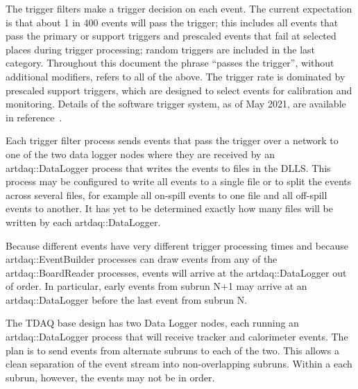 
The trigger filters make a trigger decision on each event.
The current expectation is that about 1 in 400 events will pass the trigger;
this includes all events that pass the primary or support triggers
and prescaled events that fail at selected places during trigger processing;
random triggers are included in the last category.
Throughout this document the phrase ``passes the trigger'', without additional modifiers,
refers to all of the above.
The trigger rate is dominated by prescaled support triggers,
which are designed to select events for calibration and monitoring.
Details of the software trigger system, as of May 2021,
are available in reference~\cite{TriggerSU2020}.


Each \art trigger filter process sends events that pass the trigger over a network
to one of the two data logger nodes where they are received by an {\code artdaq::DataLogger} process
that writes the events to files in the DLLS.
This process may be configured to write all events to a single file
or to split the events across several files,
for example all on-spill events to one file and all off-spill events to another.
It has yet to be determined exactly how many files will be written
by each {\code artdaq::DataLogger}.

\begin{sloppypar}
Because different events have very different trigger processing times
and because {\code artdaq::EventBuilder} processes can draw events from
any of the {\code artdaq::BoardReader} processes, events will arrive at the
{\code artdaq::DataLogger} out of order.  In particular, early events from subrun N+1
may arrive at an {\code artdaq::DataLogger} before the last event from subrun N.
\end{sloppypar}

The TDAQ base design has two Data Logger nodes, each running an
{\code artdaq::DataLogger} process that will receive tracker and calorimeter events.
The plan is to send events from alternate subruns to each of the two.
This allows a clean separation of the event stream into non-overlapping subruns.
Within a each subrun, however, the events may not be in order.

